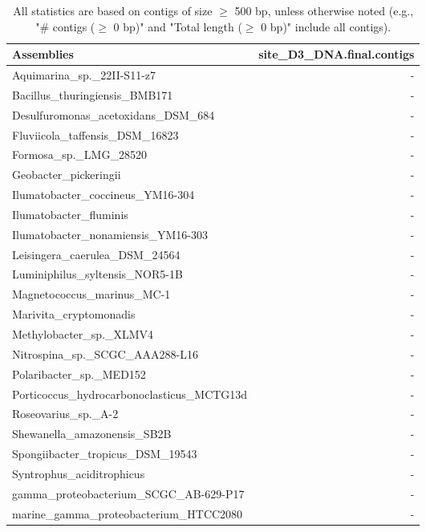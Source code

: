 \documentclass[12pt,a4paper]{article}
\begin{document}
\begin{table}[ht]
\begin{center}
\caption{All statistics are based on contigs of size $\geq$ 500 bp, unless otherwise noted (e.g., "\# contigs ($\geq$ 0 bp)" and "Total length ($\geq$ 0 bp)" include all contigs).}
\begin{tabular}{|l*{1}{|r}|}
\hline
Assemblies & site\_D3\_DNA.final.contigs \\ \hline
Aquimarina\_sp.\_22II-S11-z7 & - \\ \hline
Bacillus\_thuringiensis\_BMB171 & - \\ \hline
Desulfuromonas\_acetoxidans\_DSM\_684 & - \\ \hline
Fluviicola\_taffensis\_DSM\_16823 & - \\ \hline
Formosa\_sp.\_LMG\_28520 & - \\ \hline
Geobacter\_pickeringii & - \\ \hline
Ilumatobacter\_coccineus\_YM16-304 & - \\ \hline
Ilumatobacter\_fluminis & - \\ \hline
Ilumatobacter\_nonamiensis\_YM16-303 & - \\ \hline
Leisingera\_caerulea\_DSM\_24564 & - \\ \hline
Luminiphilus\_syltensis\_NOR5-1B & - \\ \hline
Magnetococcus\_marinus\_MC-1 & - \\ \hline
Marivita\_cryptomonadis & - \\ \hline
Methylobacter\_sp.\_XLMV4 & - \\ \hline
Nitrospina\_sp.\_SCGC\_AAA288-L16 & - \\ \hline
Polaribacter\_sp.\_MED152 & - \\ \hline
Porticoccus\_hydrocarbonoclasticus\_MCTG13d & - \\ \hline
Roseovarius\_sp.\_A-2 & - \\ \hline
Shewanella\_amazonensis\_SB2B & - \\ \hline
Spongiibacter\_tropicus\_DSM\_19543 & - \\ \hline
Syntrophus\_aciditrophicus & - \\ \hline
gamma\_proteobacterium\_SCGC\_AB-629-P17 & - \\ \hline
marine\_gamma\_proteobacterium\_HTCC2080 & - \\ \hline
\end{tabular}
\end{center}
\end{table}
\end{document}
